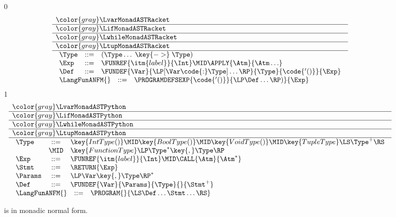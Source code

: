 \documentclass[7x10]{TimesAPriori_MIT}%
\newcommand{\gray}[1]{{\color{gray} #1}}
\def\racketEd{0}
\def\pythonEd{1}
\def\edition{1}
\newcommand{\pythonColor}[0]{}
\numberwithin{theorem}{chapter}
\numberwithin{definition}{chapter}
\numberwithin{equation}{chapter}
\begin{document}
\newcommand{\LfunMonadASTRacket}{
  \begin{array}{lcl}
  \Type &::=& (\Type \ldots \; \key{->}\; \Type) \\
  \Exp &::=& \FUNREF{\itm{label}}{\Int} \MID \APPLY{\Atm}{\Atm\ldots}\\
  \Def &::=& \FUNDEF{\Var}{\LP[\Var \code{:} \Type]\ldots\RP}{\Type}{\code{'()}}{\Exp}
  \end{array}
}

\newcommand{\LfunMonadASTPython}{
  \begin{array}{lcl}
    \Type &::=& \key{IntType()} \MID \key{BoolType()} \MID \key{VoidType()}
        \MID \key{TupleType}\LS\Type^+\RS\\
        &\MID& \key{FunctionType}\LP \Type^{*} \key{, } \Type \RP \\
    \Exp &::=& \FUNREF{\itm{label}}{\Int} \MID \CALL{\Atm}{\Atm^{*}}\\
    \Stmt &::=& \RETURN{\Exp} \\
   \Params &::=&  \LP\Var\key{,}\Type\RP^* \\
   \Def &::=& \FUNDEF{\Var}{\Params}{\Type}{}{\Stmt^{+}} 
  \end{array}
}

\begin{figure}[tp]
\centering
\begin{tcolorbox}[colback=white]
\footnotesize
{\if\edition\racketEd    
\[
\begin{array}{l}
  \gray{\LvarMonadASTRacket} \\ \hline
  \gray{\LifMonadASTRacket} \\ \hline
  \gray{\LwhileMonadASTRacket} \\ \hline
  \gray{\LtupMonadASTRacket} \\ \hline
  \LfunMonadASTRacket \\
\begin{array}{rcl}
\LangFunANFM{}  &::=& \PROGRAMDEFSEXP{\code{'()}}{\LP\Def\ldots\RP)}{\Exp}
\end{array}
\end{array}
\]
\fi}
{\if\edition\pythonEd\pythonColor
\[
\begin{array}{l}
  \gray{\LvarMonadASTPython} \\ \hline
  \gray{\LifMonadASTPython} \\ \hline
  \gray{\LwhileMonadASTPython} \\ \hline
  \gray{\LtupMonadASTPython} \\ \hline
  \LfunMonadASTPython \\
  \begin{array}{rcl}
     \LangFunANFM{} &::=& \PROGRAM{}{\LS \Def \ldots \Stmt \ldots \RS}
  \end{array}
\end{array}
\]
\fi}
\end{tcolorbox}

\caption{\LangFunANF{} is \LangFunRef{} in monadic normal form.}
\label{fig:Lfun-anf-syntax}
\end{figure}
\end{document}

